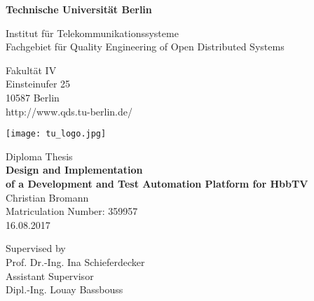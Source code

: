 \thispagestyle{empty}
\begin{center}

\vspace*{1.4cm}
{\LARGE \textbf{Technische Universität Berlin}}

\vspace{0.5cm}

{\large Institut für Telekommunikationssysteme\\[1mm]}
{\large Fachgebiet für Quality Engineering of Open Distributed Systems\\[5mm]}

Fakultät IV\\
Einsteinufer 25\\
10587 Berlin\\
http://www.qds.tu-berlin.de/\\

\vspace*{1cm}

\texttt{[image: tu\_logo.jpg]}

\vspace*{1.0cm}

{\LARGE Diploma Thesis}\\

\vspace{1.0cm}
{\LARGE \textbf{Design and Implementation}}\\
\vspace*{0.3cm}
{\LARGE \textbf{of a Development and Test Automation Platform for HbbTV}}\\
\vspace*{1.0cm}
{\LARGE Christian Bromann}
\\
\vspace*{0.5cm}
Matriculation Number: 359957\\
16.08.2017\\ %
\vspace*{1.0cm}

Supervised by\\
Prof. Dr.-Ing. Ina Schieferdecker\\
\vspace*{0.5cm}
Assistant Supervisor\\
Dipl.-Ing. Louay Bassbouss
\vspace{3cm}


\end{center}
